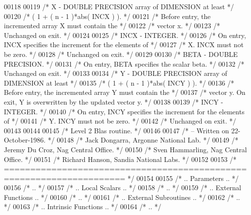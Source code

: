 \begin{DoxyCode}
00118 
00119 \textcolor{comment}{/*  X      - DOUBLE PRECISION array of DIMENSION at least */}
00120 \textcolor{comment}{/*           ( 1 + ( n - 1 )*abs( INCX ) ). */}
00121 \textcolor{comment}{/*           Before entry, the incremented array X must contain the */}
00122 \textcolor{comment}{/*           vector x. */}
00123 \textcolor{comment}{/*           Unchanged on exit. */}
00124 
00125 \textcolor{comment}{/*  INCX   - INTEGER. */}
00126 \textcolor{comment}{/*           On entry, INCX specifies the increment for the elements of */}
00127 \textcolor{comment}{/*           X. INCX must not be zero. */}
00128 \textcolor{comment}{/*           Unchanged on exit. */}
00129 
00130 \textcolor{comment}{/*  BETA   - DOUBLE PRECISION. */}
00131 \textcolor{comment}{/*           On entry, BETA specifies the scalar beta. */}
00132 \textcolor{comment}{/*           Unchanged on exit. */}
00133 
00134 \textcolor{comment}{/*  Y      - DOUBLE PRECISION array of DIMENSION at least */}
00135 \textcolor{comment}{/*           ( 1 + ( n - 1 )*abs( INCY ) ). */}
00136 \textcolor{comment}{/*           Before entry, the incremented array Y must contain the */}
00137 \textcolor{comment}{/*           vector y. On exit, Y is overwritten by the updated vector y. */}
00138 
00139 \textcolor{comment}{/*  INCY   - INTEGER. */}
00140 \textcolor{comment}{/*           On entry, INCY specifies the increment for the elements of */}
00141 \textcolor{comment}{/*           Y. INCY must not be zero. */}
00142 \textcolor{comment}{/*           Unchanged on exit. */}
00143 
00144 
00145 \textcolor{comment}{/*  Level 2 Blas routine. */}
00146 
00147 \textcolor{comment}{/*  -- Written on 22-October-1986. */}
00148 \textcolor{comment}{/*     Jack Dongarra, Argonne National Lab. */}
00149 \textcolor{comment}{/*     Jeremy Du Croz, Nag Central Office. */}
00150 \textcolor{comment}{/*     Sven Hammarling, Nag Central Office. */}
00151 \textcolor{comment}{/*     Richard Hanson, Sandia National Labs. */}
00152 
00153 \textcolor{comment}{/*  ===================================================================== */}
00154 
00155 \textcolor{comment}{/*     .. Parameters .. */}
00156 \textcolor{comment}{/*     .. */}
00157 \textcolor{comment}{/*     .. Local Scalars .. */}
00158 \textcolor{comment}{/*     .. */}
00159 \textcolor{comment}{/*     .. External Functions .. */}
00160 \textcolor{comment}{/*     .. */}
00161 \textcolor{comment}{/*     .. External Subroutines .. */}
00162 \textcolor{comment}{/*     .. */}
00163 \textcolor{comment}{/*     .. Intrinsic Functions .. */}
00164 \textcolor{comment}{/*     .. */}

\end{DoxyCode}
